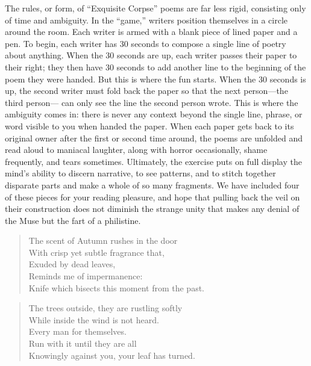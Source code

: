 \begin{justify}
    \noindent{}The rules, or form, of
    “Exquisite Corpse” poems are far less rigid,
    consisting only of time and ambiguity.
    In the “game,” writers position themselves
    in a circle around the room. Each writer is
    armed with a blank piece of lined paper and
    a pen. To begin, each writer has 30 seconds
    to compose a single line of poetry about
    anything. When the 30 seconds are up, each
    writer passes their paper to their right;
    they then have 30 seconds to add another
    line to the beginning of the poem they were
    handed. But this is where the fun starts.
    When the 30 seconds is up, the second writer
    must fold back the paper
    so that the next person---the third person---
    can only see the line the second person
    wrote. This is where the ambiguity comes in:
    there is never any context beyond the single
    line, phrase, or word visible to you when
    handed the paper. When each paper gets back
    to its original owner after the first or
    second time around, the poems are unfolded
    and read aloud to maniacal laughter, along with
    horror occasionally, shame frequently, and
    tears sometimes. Ultimately, the exercise
    puts on full display the mind's ability to
    discern narrative, to see patterns, and to stitch
    together disparate parts and make a whole of
    so many fragments. We have included four of
    these pieces for your reading pleasure, and
    hope that pulling back the veil on their
    construction does not diminish the strange
    unity that makes any denial of the Muse but
    the fart of a philistine.
\end{justify}
\clearpage
\pagestyle{main}

\clearpage
\setauthor{}


\begin{verse}
    The scent of Autumn rushes in the door\\
    With crisp yet subtle fragrance that,\\
    Exuded by dead leaves,\\
    Reminds me of impermanence:\\
    Knife which bisects this moment from the past.\\
\end{verse}

\vfill

\settowidth{\versewidth}{Knowingly against you, your leaf has turned.}
\hfill\begin{minipage}{\versewidth + \vleftmargin + 15pt}
\begin{verse}
    The trees outside, they are rustling softly\\ 
    While inside the wind is not heard.\\
    Every man for themselves.\\
    Run with it until they are all\\
    Knowingly against you, your leaf has turned.\\
\end{verse}
\end{minipage}


